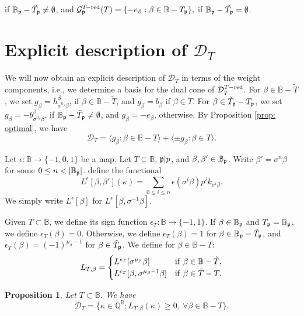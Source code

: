 \documentclass[11pt,pdflatex]{amsart}
\theoremstyle{plain}
\theoremstyle{definition}
\newcommand{\QQ}{\mathbf{Q}}
\theoremstyle{plain}
\newtheorem{prop}[theorem]{Proposition}
\theoremstyle{definition}
\theoremstyle{remark}
\numberwithin{equation}{section}
\numberwithin{figure}{section} \numberwithin{table}{subsection}
\newcommand{\gerp}{{\frak{p}}}
\newcommand{\calD}{{\mathcal{D}}}
\newcommand{\calG}{{\mathcal{G}}}
\def\BB{\mathbb{B}}
\def\QQ{\mathbb{Q}}
\begin{document}
if $\BB_\gerp-\tilde{T_\gerp}\neq \emptyset$, and  $\calG_\gerp^{T\!-{\rm red}}(T)= \{-e_{\beta}: \beta \in \BB-T_\gerp\},$ if  $\BB_\gerp-\tilde{T_\gerp}=\emptyset$.

 \section {Explicit description of $\calD_T$}\label{section:explicit}
We will now obtain an explicit description of $\calD_T$ in terms of the weight components, i.e., we determine a basis for the dual cone of $\calD_T^{T-{\rm red}}$.  For $\beta \in \BB-\tilde{T}$, we set  $g_\beta=h_{\sigma^{n_\beta}\beta}^{\beta}$, if $\beta \in \BB-\tilde{T}$, and $g_\beta=b_\beta$ if $\beta \in T$.  For $\beta \in \tilde{T}_\gerp-T_\gerp$, we set  $g_\beta=-b_{\sigma^{n_\beta}\beta}^\beta$, if $\BB_\gerp-\tilde{T}_\gerp\neq\emptyset$, and $g_\beta=-e_\beta$, otherwise. By Proposition \ref{prop: optimal}, we have
$$
\calD_T=\langle g_\beta : \beta \in \BB-T \rangle   +  \langle \pm g_\beta: \beta \in T \rangle.$$

Let $\epsilon:\BB \rightarrow \{-1,0,1\}$ be a  map.  Let $T \subseteq \BB$, $\gerp|p$, and $\beta,\beta' \in \BB_\gerp$. Write $\beta'=\sigma^n\beta$ for some  $0 \leq n < |\BB_\gerp|$. define the functional
$$L^\epsilon[\beta,\beta'](\kappa)=\sum_{0 \leq i \leq n} \epsilon(\sigma^i\beta)p^ik_{\sigma^i\beta}.$$
We simply write $L^\epsilon[\beta]$ for $L^\epsilon[\beta,\sigma^{-1}\beta]$. 


Given $T \subset \BB$,  we define its sign function $\epsilon_T: \BB \rightarrow \{-1,1\}$. If $\beta \in \BB_\gerp$ and $T_\gerp=\BB_\gerp$, we define $\epsilon_T(\beta)=0$. Otherwise, we define $\epsilon_T(\beta)=1$ for $\beta \in \BB_\gerp-\tilde{T}_\gerp$, and $\epsilon_T(\beta)=(-1)^{\mu_\beta-1}$ for  $\beta \in \tilde{T}_\gerp$. We define for $\beta \in \BB-T$:
\[
L_{T,\beta}=\begin{cases}
L^{\epsilon_T}[\sigma^{\mu_\beta}\beta] & {\rm if}\ \beta \in \BB-\tilde{T},\\
L^{\epsilon_T}[\beta,\sigma^{\mu_\beta-1}\beta]& {\rm if}\ \beta \in \tilde{T}-T.
\end{cases}
\]

 
\begin{prop} \label{prop:explicit} Let $T \subset \BB$. We have    
$$\calD_T=\{\kappa \in \QQ^\BB: L_{T,\beta}(\kappa) \geq 0,\ \forall \beta \in \BB-T\}.$$


\end{prop}
\end{document}
